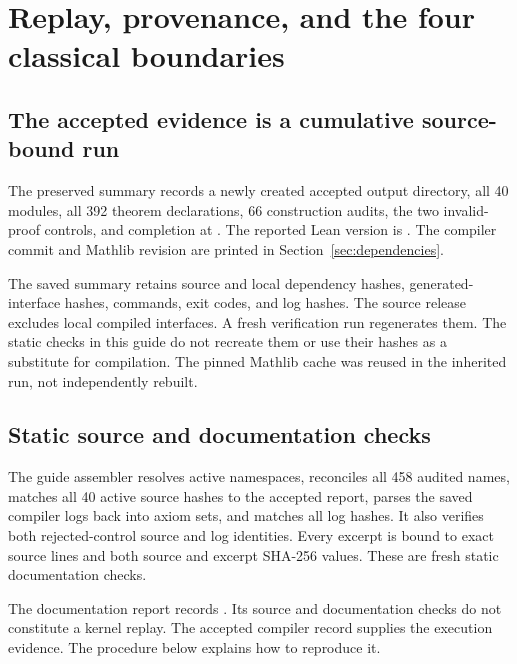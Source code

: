 \section{Replay, provenance, and the four classical boundaries}
\subsection{The accepted evidence is a cumulative source-bound run}
The preserved summary  records a newly created accepted output directory, all 40 modules, all 392 theorem declarations, 66 construction audits, the two invalid-proof controls, and completion at . The reported Lean version is . The compiler commit and Mathlib revision are printed in Section~\ref{sec:dependencies}.

The saved summary retains source and local dependency hashes, generated-interface hashes, commands, exit codes, and log hashes. The source release excludes local compiled interfaces. A fresh verification run regenerates them. The static checks in this guide do not recreate them or use their hashes as a substitute for compilation. The pinned Mathlib cache was reused in the inherited run, not independently rebuilt.

\subsection{Static source and documentation checks}
The guide assembler resolves active namespaces, reconciles all 458 audited names, matches all 40 active source hashes to the accepted report, parses the saved compiler logs back into axiom sets, and matches all log hashes. It also verifies both rejected-control source and log identities. Every excerpt is bound to exact source lines and both source and excerpt SHA-256 values. These are fresh static documentation checks.

The documentation report records . Its source and documentation checks do not constitute a kernel replay. The accepted compiler record supplies the execution evidence. The procedure below explains how to reproduce it.


